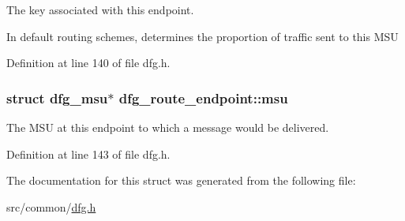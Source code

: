 The key associated with this endpoint. 

In default routing schemes, determines the proportion of traffic sent to this M\-S\-U 

Definition at line 140 of file dfg.\-h.

\hypertarget{structdfg__route__endpoint_aa05dabbb8629dbf8d032ef0d4f304e4d}{
\subsubsection[{msu}]{\setlength{\rightskip}{0pt plus 5cm}struct {\bf dfg\-\_\-msu}$\ast$ dfg\-\_\-route\-\_\-endpoint\-::msu}}\label{structdfg__route__endpoint_aa05dabbb8629dbf8d032ef0d4f304e4d}


The M\-S\-U at this endpoint to which a message would be delivered. 



Definition at line 143 of file dfg.\-h.



The documentation for this struct was generated from the following file\-:\begin{DoxyCompactItemize}
\item 
src/common/\hyperlink{dfg_8h}{dfg.\-h}\end{DoxyCompactItemize}
